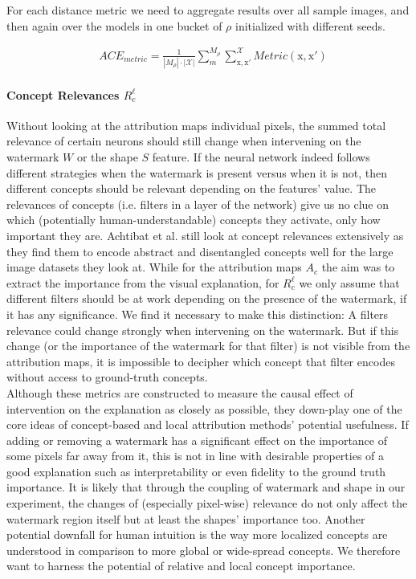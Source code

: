 For each distance metric we need to aggregate results over all sample images, and then again over the models in one bucket of $\rho$ initialized with different seeds.

\begin{align}\label{eq:ace_metric}
& ACE_{metric} = \frac{1}{|M_\rho|\cdot |\mathcal{X}| }\sum_{m}^{M_{\rho}} \sum_{\mathrm{x,x'}}^{\mathcal{X}} Metric(\mathrm{x,x'})
\end{align}

\paragraph{Concept Relevances $R_c^{\ell}$}
Without looking at the attribution maps individual pixels, the summed total relevance of certain neurons should still change when intervening on the watermark $W$ or the shape $S$ feature. If the neural network indeed follows different strategies when the watermark is present versus when it is not, then different concepts should be relevant depending on the features' value. 
The relevances of concepts (i.e. filters in a layer of the network) give us no clue on which (potentially human-understandable) concepts they activate, only how important they are. Achtibat et al. still look at concept relevances extensively as they find them to encode abstract and disentangled concepts well for the large image datasets they look at. While for the attribution maps $A_c$ the aim was to extract the importance from the visual explanation, for $R_c^{\ell}$ we only assume that different filters should be at work depending on the presence of the watermark, if it has any significance.
We find it necessary to make this distinction: A filters relevance could change strongly when intervening on the watermark. But if this change (or the importance of the watermark for that filter) is not visible from the attribution maps, it is impossible to decipher which concept that filter encodes without access to ground-truth concepts.\\

Although these metrics are constructed to measure the causal effect of intervention on the explanation as closely as possible, they down-play one of the core ideas of concept-based and local attribution methods' potential usefulness. If adding or removing a watermark has a significant effect on the importance of some pixels far away from it, this is not in line with desirable properties of a good explanation such as interpretability or even fidelity to the ground truth importance. It is likely that through the coupling of watermark and shape in our experiment, the changes of (especially pixel-wise) relevance do not only affect the watermark region itself but at least the shapes' importance too. 
Another potential downfall for human intuition is the way more localized concepts are understood in comparison to more global or wide-spread concepts.  We therefore want to harness the potential of relative and local concept importance.\\ 

